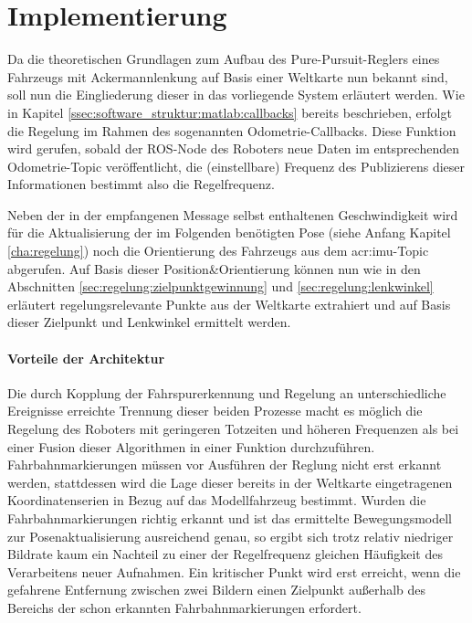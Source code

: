 \section{Implementierung \dcsecondauthorshort}
\label{sec:regelung:implementierung}
Da die theoretischen Grundlagen zum Aufbau des \glqq Pure-Pursuit\grqq-Reglers eines Fahrzeugs mit Ackermannlenkung auf Basis einer Weltkarte nun bekannt sind, soll nun die Eingliederung dieser in das vorliegende System erläutert werden. Wie in Kapitel \ref{ssec:software_struktur:matlab:callbacks} bereits beschrieben, erfolgt die Regelung im Rahmen des sogenannten Odometrie-Callbacks. Diese Funktion wird gerufen, sobald der ROS-Node des Roboters neue Daten im entsprechenden Odometrie-Topic veröffentlicht, die (einstellbare) Frequenz des Publizierens dieser Informationen bestimmt also die Regelfrequenz.

Neben der in der empfangenen Message selbst enthaltenen Geschwindigkeit wird für die Aktualisierung der im Folgenden benötigten Pose (siehe Anfang Kapitel \ref{cha:regelung}) noch die Orientierung des Fahrzeugs aus dem \gls{acr:imu}-Topic abgerufen. Auf Basis dieser Position\&Orientierung können nun wie in den Abschnitten \ref{sec:regelung:zielpunktgewinnung} und \ref{sec:regelung:lenkwinkel} erläutert regelungsrelevante Punkte aus der Weltkarte extrahiert und auf Basis dieser Zielpunkt und Lenkwinkel ermittelt werden.

\paragraph{Vorteile der Architektur}
Die durch Kopplung der Fahrspurerkennung und Regelung an unterschiedliche Ereignisse erreichte Trennung dieser beiden Prozesse macht es möglich die Regelung des Roboters mit geringeren Totzeiten und höheren Frequenzen als bei einer Fusion dieser Algorithmen in einer Funktion durchzuführen. Fahrbahnmarkierungen müssen vor Ausführen der Reglung nicht erst erkannt werden, stattdessen wird die Lage dieser bereits in der Weltkarte eingetragenen Koordinatenserien in Bezug auf das Modellfahrzeug bestimmt. Wurden die Fahrbahnmarkierungen richtig erkannt und ist das ermittelte Bewegungsmodell zur Posenaktualisierung ausreichend genau, so ergibt sich trotz relativ niedriger Bildrate kaum ein Nachteil zu einer der Regelfrequenz gleichen Häufigkeit des Verarbeitens neuer Aufnahmen. Ein kritischer Punkt wird erst erreicht, wenn die gefahrene Entfernung zwischen zwei Bildern einen Zielpunkt außerhalb des Bereichs der schon erkannten Fahrbahnmarkierungen erfordert.